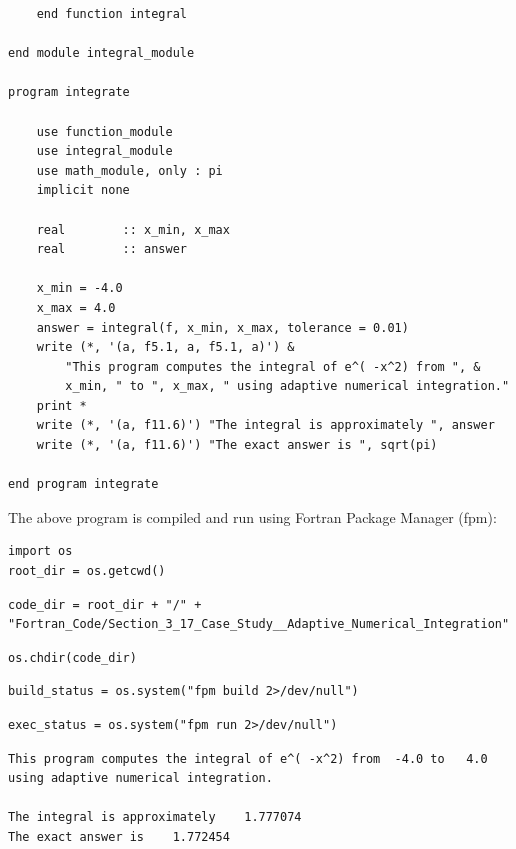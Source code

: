 \begin{verbatim}
    end function integral

end module integral_module

program integrate

    use function_module
    use integral_module
    use math_module, only : pi
    implicit none

    real        :: x_min, x_max
    real        :: answer

    x_min = -4.0
    x_max = 4.0
    answer = integral(f, x_min, x_max, tolerance = 0.01)
    write (*, '(a, f5.1, a, f5.1, a)') & 
        "This program computes the integral of e^( -x^2) from ", &
        x_min, " to ", x_max, " using adaptive numerical integration."
    print *
    write (*, '(a, f11.6)') "The integral is approximately ", answer
    write (*, '(a, f11.6)') "The exact answer is ", sqrt(pi)

end program integrate
\end{verbatim}

The above program is compiled and run using Fortran Package Manager (fpm):

\begin{verbatim}
import os
root_dir = os.getcwd()
\end{verbatim}

\begin{verbatim}
code_dir = root_dir + "/" + "Fortran_Code/Section_3_17_Case_Study__Adaptive_Numerical_Integration"
\end{verbatim}

\begin{verbatim}
os.chdir(code_dir)
\end{verbatim}

\begin{verbatim}
build_status = os.system("fpm build 2>/dev/null")
\end{verbatim}

\begin{verbatim}
exec_status = os.system("fpm run 2>/dev/null")
\end{verbatim}

\begin{verbatim}
This program computes the integral of e^( -x^2) from  -4.0 to   4.0 using adaptive numerical integration.

The integral is approximately    1.777074
The exact answer is    1.772454
\end{verbatim}